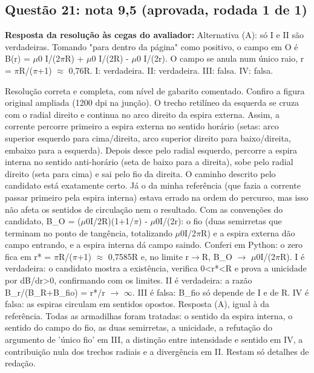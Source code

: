 \documentclass{article}%
\begin{document}
\subsection*{Questão 21: nota 9,5 (aprovada, rodada 1 de 1)}%
\textbf{Resposta da resolução às cegas do avaliador:} Alternativa (A): só I e II são verdadeiras. Tomando "para dentro da página" como positivo, o campo em O é B(r) = $\mu$0 I/(2$\pi$R) + $\mu$0 I/(2R) - $\mu$0 I/(2r). O campo se anula num único raio, r = $\pi$R/($\pi$+1) $\approx$ 0,76R. I: verdadeira. II: verdadeira. III: falsa. IV: falsa.\par %
Resolução correta e completa, com nível de gabarito comentado. Confiro a figura original ampliada (1200 dpi na junção). O trecho retilíneo da esquerda se cruza com o radial direito e continua no arco direito da espira externa. Assim, a corrente percorre primeiro a espira externa no sentido horário (setas: arco superior esquerdo para cima/direita, arco superior direito para baixo/direita, embaixo para a esquerda). Depois desce pelo radial esquerdo, percorre a espira interna no sentido anti{-}horário (seta de baixo para a direita), sobe pelo radial direito (seta para cima) e sai pelo fio da direita. O caminho descrito pelo candidato está exatamente certo. Já o da minha referência (que fazia a corrente passar primeiro pela espira interna) estava errado na ordem do percurso, mas isso não afeta os sentidos de circulação nem o resultado. Com as convenções do candidato, B\_O = ($\mu$0I/2R)(1+1/$\pi$) - $\mu$0I/(2r): o fio (duas semirretas que terminam no ponto de tangência, totalizando $\mu$0I/2$\pi$R) e a espira externa dão campo entrando, e a espira interna dá campo saindo. Conferi em Python: o zero fica em r* = $\pi$R/($\pi$+1) $\approx$ 0,7585R e, no limite r$\to$R, B\_O $\to$ $\mu$0I/(2$\pi$R). I é verdadeira: o candidato mostra a existência, verifica 0<r*<R e prova a unicidade por dB/dr>0, confirmando com os limites. II é verdadeira: a razão B\_r/(B\_R+B\_fio) = r*/r $\to$ $\infty$. III é falsa: B\_fio só depende de I e de R. IV é falsa: as espiras circulam em sentidos opostos. Resposta (A), igual à da referência. Todas as armadilhas foram tratadas: o sentido da espira interna, o sentido do campo do fio, as duas semirretas, a unicidade, a refutação do argumento de 'único fio' em III, a distinção entre intensidade e sentido em IV, a contribuição nula dos trechos radiais e a divergência em II. Restam só detalhes de redação.%
\end{document}
